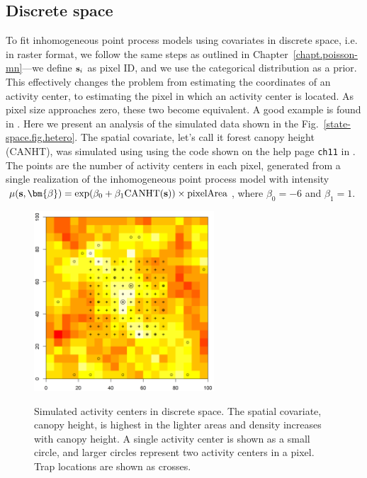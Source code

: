 \subsection{Discrete space}
\label{modeling.sec.discrete}

To fit inhomogeneous point process models using covariates in discrete
space, i.e. in raster format, we follow the same steps
as outlined in Chapter~\ref{chapt.poisson-mn}---we define ${\bf s}_i$ as
pixel ID, and we use the categorical distribution as a prior. This
effectively changes the problem from estimating the coordinates of an
activity center, to estimating the pixel in which an activity center is
located. As pixel size approaches zero, these two become equivalent. A good
example is found in \citep{mollet_etal:2012}. Here we present
an analysis of the simulated data shown in the %
Fig.~\ref{state-space.fig.hetero}. The spatial covariate, let's call it
forest canopy height (CANHT), was simulated
using using the code shown on the help page
\verb+ch11+ in \scrbook. The points are the number of
activity centers in each pixel, generated from a single realization of
the inhomogeneous point process model with intensity
$\mu(\mathbf{s}, \bm{\beta}) = \exp(\beta_0 + \beta_1
\text{CANHT}({\bf s}))\times\text{pixelArea}$,
where $\beta_0 = -6$ and $\beta_1 = 1$.
\begin{figure}%
\centering
\includegraphics[width=0.6\textwidth]{Ch11-Statespace/figs/discrete}
\label{state-space.fig.discrete}
\caption{Simulated activity centers in discrete space. The spatial
  covariate, canopy height, is highest in the lighter areas and
  density increases with canopy height. A single
  activity center is shown as a small circle, and larger circles
  represent two activity centers in a pixel. Trap locations
  are shown as crosses.}
\end{figure}

